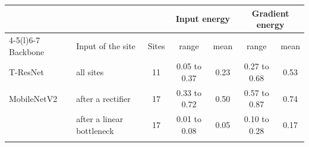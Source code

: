 \begin{tabular}{@{}llc cc cc@{}}
\toprule
 & & & \multicolumn{2}{c}{Input energy} & \multicolumn{2}{c}{Gradient energy} \\
\cmidrule(lr){4-5}\cmidrule(l){6-7}
Backbone & Input of the site & Sites & range & mean & range & mean \\
\midrule
T-ResNet & all sites & 11 & 0.05 to 0.37 & 0.23 & 0.27 to 0.68 & 0.53 \\
MobileNetV2 & after a rectifier & 17 & 0.33 to 0.72 & 0.50 & 0.57 to 0.87 & 0.74 \\
 & after a linear bottleneck & 17 & 0.01 to 0.08 & 0.05 & 0.10 to 0.28 & 0.17 \\
\botrule
\end{tabular}
